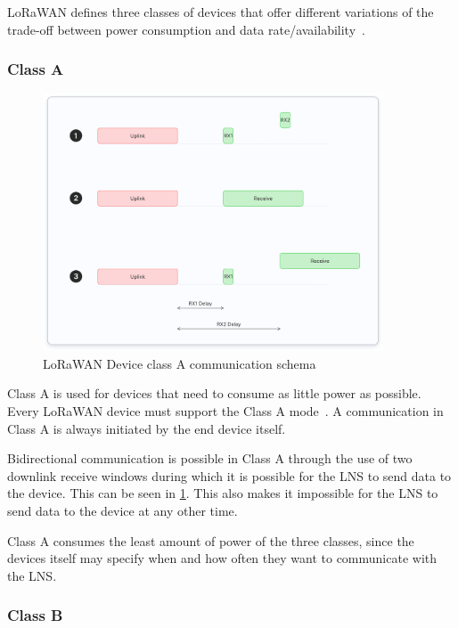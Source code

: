 \ac{LoRaWAN} defines three classes of devices that offer different variations of the trade-off between power consumption and data rate/availability~\cite[p. 10]{lora_alliance_inc_lorawan_2017}.

\subsubsection{Class A}

\begin{figure}[h]
    \centering
    \includegraphics[width=0.9\textwidth]{pictures/device-classes/class-a.png}
    \caption{\ac{LoRaWAN} Device class A communication schema~\protect\cite{the_things_network_device_nodate}}
    \label{pic:lorawan-device-class-a-schema}
\end{figure}

Class A is used for devices that need to consume as little power as possible.
Every \ac{LoRaWAN} device must support the Class A mode~\cite[p. 11]{lora_alliance_inc_lorawan_2017}.
A communication in Class A is always initiated by the end device itself.

Bidirectional communication is possible in Class A through the use of two downlink receive windows during which it is possible for the \ac{LNS} to send data to the device.
This can be seen in \cref{pic:lorawan-device-class-a-schema}.
This also makes it impossible for the \ac{LNS} to send data to the device at any other time.

Class A consumes the least amount of power of the three classes, since the devices itself may specify when and how often they want to communicate with the \ac{LNS}.

\subsubsection{Class B}

